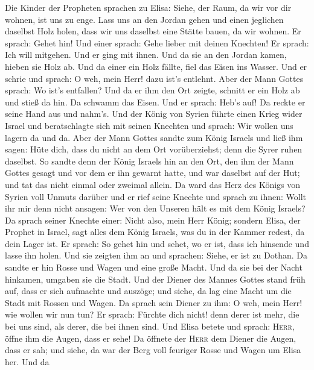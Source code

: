  Die Kinder der Propheten sprachen zu Elisa: Siehe, der
Raum, da wir vor dir wohnen, ist uns zu enge.  Lass uns an
den Jordan gehen und einen jeglichen daselbst Holz holen, dass wir uns
daselbst eine Stätte bauen, da wir wohnen. Er sprach: Gehet hin!
 Und einer sprach: Gehe lieber mit deinen Knechten! Er
sprach: Ich will mitgehen.  Und er ging mit ihnen. Und da
sie an den Jordan kamen, hieben sie Holz ab.  Und da einer
ein Holz fällte, fiel das Eisen ins Wasser. Und er schrie und sprach: O
weh, mein Herr! dazu ist's entlehnt.  Aber der Mann Gottes
sprach: Wo ist's entfallen? Und da er ihm den Ort zeigte, schnitt er ein
Holz ab und stieß da hin. Da schwamm das Eisen.  Und er
sprach: Heb's auf! Da reckte er seine Hand aus und nahm's.
 Und der König von Syrien führte einen Krieg wider Israel
und beratschlagte sich mit seinen Knechten und sprach: Wir wollen uns
lagern da und da.  Aber der Mann Gottes sandte zum König
Israels und ließ ihm sagen: Hüte dich, dass du nicht an dem Ort
vorüberziehst; denn die Syrer ruhen daselbst.  So sandte
denn der König Israels hin an den Ort, den ihm der Mann Gottes gesagt
und vor dem er ihn gewarnt hatte, und war daselbst auf der Hut; und tat
das nicht einmal oder zweimal allein.  Da ward das Herz
des Königs von Syrien voll Unmuts darüber und er rief seine Knechte und
sprach zu ihnen: Wollt ihr mir denn nicht ansagen: Wer von den Unseren
hält es mit dem König Israels?  Da sprach seiner Knechte
einer: Nicht also, mein Herr König; sondern Elisa, der Prophet in
Israel, sagt alles dem König Israels, was du in der Kammer redest, da
dein Lager ist.  Er sprach: So gehet hin und sehet, wo er
ist, dass ich hinsende und lasse ihn holen. Und sie zeigten ihm an und
sprachen: Siehe, er ist zu Dothan.  Da sandte er hin
Rosse und Wagen und eine große Macht. Und da sie bei der Nacht hinkamen,
umgaben sie die Stadt.  Und der Diener des Mannes Gottes
stand früh auf, dass er sich aufmachte und auszöge; und siehe, da lag
eine Macht um die Stadt mit Rossen und Wagen. Da sprach sein Diener zu
ihm: O weh, mein Herr! wie wollen wir nun tun?  Er
sprach: Fürchte dich nicht! denn derer ist mehr, die bei uns sind, als
derer, die bei ihnen sind.  Und Elisa betete und sprach:
\textsc{Herr}, öffne ihm die Augen, dass er sehe! Da öffnete der
\textsc{Herr} dem Diener die Augen, dass er sah; und siehe, da war der
Berg voll feuriger Rosse und Wagen um Elisa her.  Und da
